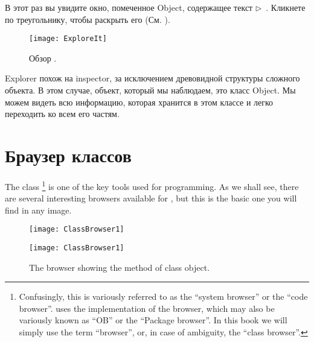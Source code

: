\documentclass[a4paper,10pt,twoside]{book}
\begin{document}
В этот раз вы увидите окно, помеченное Object,
содержащее текст \mbox{$\triangleright$ }.
Кликнете по треугольнику, чтобы раскрыть его (См. ).

\begin{figure}[htb]
\centerline {\texttt{[image: ExploreIt]}}
\caption{Обзор . }
\end{figure}


Explorer похож на inspector, за исключением древовидной структуры
сложного объекта. В этом случае, объект, который мы наблюдаем,
это класс Object. Мы можем видеть всю информацию, которая хранится
в этом классе и легко переходить ко всем его частям.

\section{Браузер классов}

The class \footnote{Confusingly, this is variously referred to as the ``system browser'' or the ``code browser''. \pharo uses the  implementation of the browser, which may also be variously known as ``OB'' or the ``Package browser''.
In this book we will simply use the term ``browser'', or, in case of ambiguity, the ``class browser''.} is one of the key tools used for programming.
As we shall see, there are several interesting browsers available for \pharo, but this is the basic one you will find in any image.


\begin{figure}[htb]
\ifluluelse
	{\centerline {\texttt{[image: ClassBrowser1]}}}
	{\centerline {\texttt{[image: ClassBrowser1]}}}
\caption{The browser showing the  method of class object.
}
\end{figure}
\end{document}
